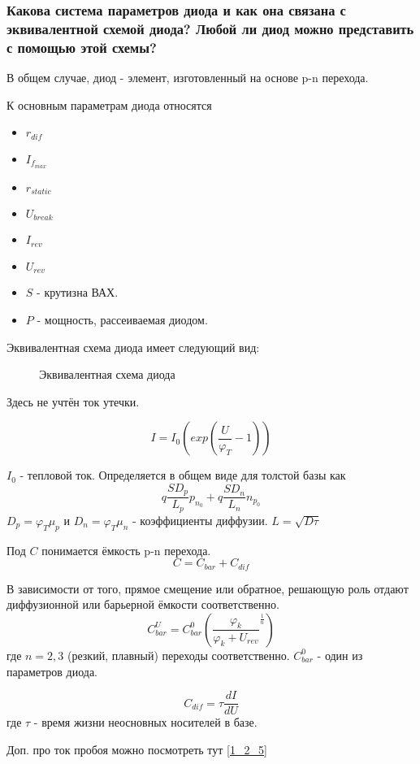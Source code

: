 \subsubsection{Какова система параметров диода и как она связана с эквивалентной схемой диода? Любой ли диод можно представить с помощью этой схемы?}

В общем случае, диод - элемент, изготовленный на основе p-n перехода.

К основным параметрам диода относятся 
\begin{itemize}
\item $r_{dif}$
\item $I_{{f}_{max}}$
\item $r_{static}$
\item $U_{break}$
\item $I_{rev}$
\item $U_{rev}$
\item $S$ - крутизна ВАХ.
\item $P$ - мощность, рассеиваемая диодом.
\end{itemize}

Эквивалентная схема диода имеет следующий вид:
\begin{center}
	\begin{figure}[h!]
		\caption{Эквивалентная схема диода}	
		\label{pic:pn-eqiv}
	\end{figure}
\end{center}

Здесь не учтён ток утечки.

$$
I = I_0(exp\left(\frac{U}{\varphi_T} - 1\right))
$$

$I_0$ - тепловой ток. Определяется в общем виде для толстой базы как
$$
q\frac{SD_p}{L_p}p_{n_0} + q\frac{SD_n}{L_n}n_{p_0}
$$
$D_p = \varphi_T\mu_p$ и $D_n =\varphi_T\mu_n$ - коэффициенты диффузии. $L = \sqrt{D\tau}$

Под $C$ понимается ёмкость p-n перехода.
$$
C = C_{bar} + C_{dif}
$$

В зависимости от того, прямое смещение или обратное, решающую роль отдают диффузионной или барьерной ёмкости соответственно.
$$
C_{bar}^U = C_{bar}^0\left(\frac{\varphi_k}{\varphi_k + U_{rev}}^{\frac{1}{n}}\right)
$$
где $n = 2,3$ (резкий, плавный) переходы соответственно.
$C_{bar}^0$ - один из параметров диода.

$$
C_{dif} = \tau\frac{dI}{dU}
$$
где $\tau$ - время жизни неосновных носителей в базе.

Доп. про ток пробоя можно посмотреть тут \ref{1_2_5}

\pagebreak
